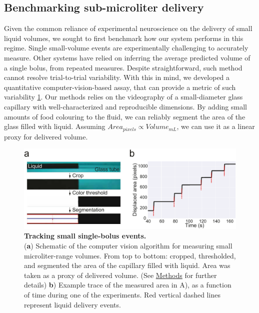 \subsection*{Benchmarking sub-microliter delivery}

Given the common reliance of experimental neuroscience on the delivery of small liquid volumes, we sought to first benchmark how our system performs in this regime. Single small-volume events are experimentally challenging to accurately measure. Other systems have relied on inferring the average predicted volume of a single bolus, from repeated measures. Despite straightforward, such method cannot resolve trial-to-trial variability. With this in mind, we developed a quantitative computer-vision-based assay, that can provide a metric of such variability \cref{fig:PumpProtocol}. Our methods relies on the videography of a small-diameter glass capillary with well-characterized and reproducible dimensions. By adding small amounts of food colouring to the fluid, we can reliably segment the area of the glass filled with liquid. Assuming $Area_{pixels} \propto Volume_{mL}$, we can use it as a linear proxy for delivered volume. 

\begin{figure} 
	\centering
	\includegraphics[width=1.0\linewidth]{Figures/Artboard 1_1.pdf}
	\caption{\textbf{Tracking small single-bolus events.}\\
		(\textbf{a}) Schematic of the computer vision algorithm for measuring small microliter-range volumes. From top to bottom: cropped, thresholded, and segmented the area of the capillary filled with liquid. Area was taken as a proxy of delivered volume. (See \hyperref[s:methods]{Methods} for further details)  \textbf{b}) Example trace of the measured area in A), as a function of time during one of the experiments. Red vertical dashed lines represent liquid delivery events.}
	\label{fig:PumpProtocol}  
\end{figure}

